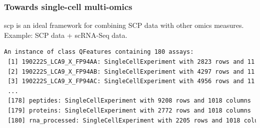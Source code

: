 \documentclass{beamer}
\newcommand{\hcode}[2][lgray]{{\ttfamily\color{vdgray}\colorbox{#1}{#2}}}
\newcommand{\frametitlesection}[1]{\frametitle{\centering #1 \footnotesize \hspace{0pt plus 1 filll} \insertsection}}
\begin{document}
\begin{frame}[fragile]
    \frametitlesection{Towards single-cell multi-omics}
    
    \hcode{scp} is an ideal framework for combining SCP data with other omics 
    measures. Example: SCP data + scRNA-Seq data.
    
    \begin{lstlisting}[language = TeX, numbers = none, basicstyle = \tiny\ttfamily\color{vdgray}]
An instance of class QFeatures containing 180 assays:
 [1] 190222S_LCA9_X_FP94AA: SingleCellExperiment with 2823 rows and 11 columns 
 [2] 190222S_LCA9_X_FP94AB: SingleCellExperiment with 4297 rows and 11 columns 
 [3] 190222S_LCA9_X_FP94AC: SingleCellExperiment with 4956 rows and 11 columns 
 ...
 [178] peptides: SingleCellExperiment with 9208 rows and 1018 columns 
 [179] proteins: SingleCellExperiment with 2772 rows and 1018 columns 
 [180] rna_processed: SingleCellExperiment with 2205 rows and 1018 columns 
    \end{lstlisting}
    
    \bigskip 
    

\end{frame}
\end{document}
